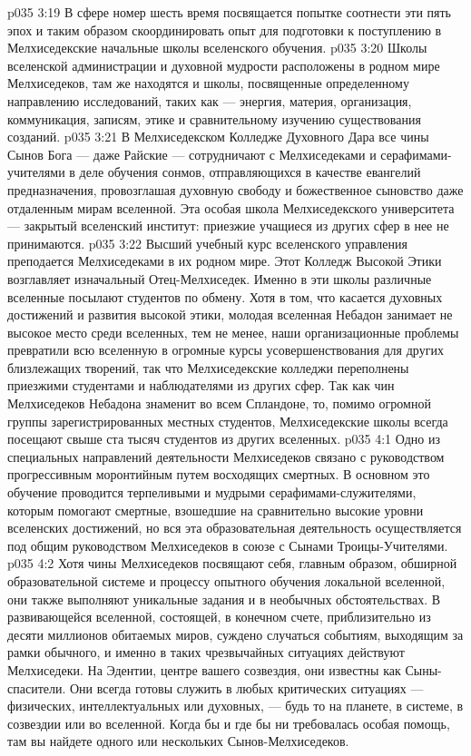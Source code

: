 \vs p035 3:19 \pc {}\bibnobreakspace В сфере номер шесть время посвящается попытке соотнести эти пять эпох и таким образом скоординировать опыт для подготовки к поступлению в Мелхиседекские начальные школы вселенского обучения.
\vs p035 3:20 \pc Школы вселенской администрации и духовной мудрости расположены в родном мире Мелхиседеков, там же находятся и школы, посвященные определенному направлению исследований, таких как --- энергия, материя, организация, коммуникация, записям, этике и сравнительному изучению существования созданий.
\vs p035 3:21 В Мелхиседекском Колледже Духовного Дара все чины Сынов Бога --- даже Райские --- сотрудничают с Мелхиседеками и серафимами\hyp{}учителями в деле обучения сонмов, отправляющихся в качестве евангелий предназначения, провозглашая духовную свободу и божественное сыновство даже отдаленным мирам вселенной. Эта особая школа Мелхиседекского университета --- закрытый вселенский институт: приезжие учащиеся из других сфер в нее не принимаются.
\vs p035 3:22 Высший учебный курс вселенского управления преподается Мелхиседеками в их родном мире. Этот Колледж Высокой Этики возглавляет изначальный Отец\hyp{}Мелхиседек. Именно в эти школы различные вселенные посылают студентов по обмену. Хотя в том, что касается духовных достижений и развития высокой этики, молодая вселенная Небадон занимает не высокое место среди вселенных, тем не менее, наши организационные проблемы превратили всю вселенную в огромные курсы усовершенствования для других близлежащих творений, так что Мелхиседекские колледжи переполнены приезжими студентами и наблюдателями из других сфер. Так как чин Мелхиседеков Небадона знаменит во всем Спландоне, то, помимо огромной группы зарегистрированных местных студентов, Мелхиседекские школы всегда посещают свыше ста тысяч студентов из других вселенных.
\vs p035 4:1 Одно из специальных направлений деятельности Мелхиседеков связано с руководством прогрессивным моронтийным путем восходящих смертных. В основном это обучение проводится терпеливыми и мудрыми серафимами\hyp{}служителями, которым помогают смертные, взошедшие на сравнительно высокие уровни вселенских достижений, но вся эта образовательная деятельность осуществляется под общим руководством Мелхиседеков в союзе с Сынами Троицы\hyp{}Учителями.
\vs p035 4:2 \pc Хотя чины Мелхиседеков посвящают себя, главным образом, обширной образовательной системе и процессу опытного обучения локальной вселенной, они также выполняют уникальные задания и в необычных обстоятельствах. В развивающейся вселенной, состоящей, в конечном счете, приблизительно из десяти миллионов обитаемых миров, суждено случаться событиям, выходящим за рамки обычного, и именно в таких чрезвычайных ситуациях действуют Мелхиседеки. На Эдентии, центре вашего созвездия, они известны как Сыны\hyp{}спасители. Они всегда готовы служить в любых критических ситуациях --- физических, интеллектуальных или духовных, --- будь то на планете, в системе, в созвездии или во вселенной. Когда бы и где бы ни требовалась особая помощь, там вы найдете одного или нескольких Сынов\hyp{}Мелхиседеков.
